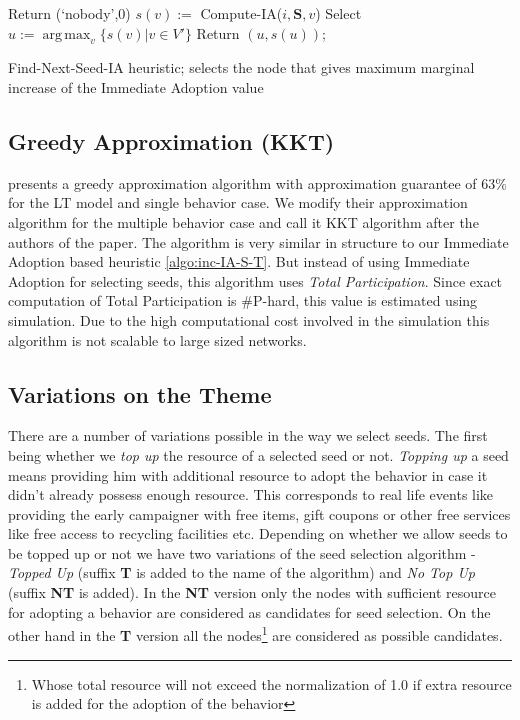 \documentclass[letterpaper]{article}
\theoremstyle{plain} 		\newtheorem{thm}{Theorem}[section]
\theoremstyle{definition} 	\newtheorem{defn}[thm]{Definition}
\theoremstyle{remark}		\newtheorem{rem}{Remark}
\DeclareMathOperator*{\argmax}{arg\,max}
\begin{document}
\begin{algorithm}[h]
\SetAlgoNoLine 
{} 

 {
    Return (`nobody',$0$)
}
 {
    $s(v) :=$ Compute-IA($i, \mathbf{S}, v$) \; 
}
Select $u:=\argmax_{v}\{s(v)|v \in V'\}$ \;    
Return $(u,s(u))$;
\caption{Find-Next-Seed-IA heuristic; selects the node that gives maximum marginal increase of the Immediate Adoption value} 
\label{algo:inc-Core-Hill-Climbing} 
\end{algorithm}

\subsection{Greedy Approximation (KKT)}
\cite{Kempe03} presents a greedy approximation algorithm with approximation guarantee of $63$\% for the LT model and single behavior case. We modify their approximation algorithm for the multiple behavior case and call it KKT algorithm after the authors of the paper. The algorithm is very similar in structure to our Immediate Adoption based heuristic \ref{algo:inc-IA-S-T}. But instead of using Immediate Adoption for selecting seeds, this algorithm uses \textit{Total Participation}. Since exact computation of Total Participation is \#P-hard, this value is estimated using simulation. Due to the high computational cost involved in the simulation this algorithm is not scalable to large sized networks.

\subsection{Variations on the Theme}
There are a number of variations possible in the way we select seeds. The first being whether we \textit{top up} the resource of a selected seed or not. \textit{Topping up} a seed means providing him with additional resource to adopt the behavior in case it didn't already possess enough resource. This corresponds to real life events like providing the early campaigner with free items, gift coupons or other free services like free access to recycling facilities etc. Depending on whether we allow seeds to be topped up or not we have two variations of the seed selection algorithm - \textit{Topped Up} (suffix \textbf{T} is added to the name of the algorithm) and \textit{No Top Up} (suffix \textbf{NT} is added). In the \textbf{NT} version only the nodes with sufficient resource for adopting a behavior are considered as candidates for seed selection. On the other hand in the \textbf{T} version all the nodes\footnote{Whose total resource will not exceed the normalization of 1.0 if extra resource is added for the adoption of the behavior} are considered as possible candidates.
\end{document}
